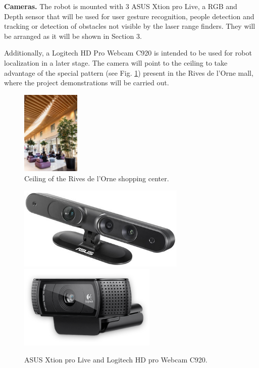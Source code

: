 {\bf Cameras.} The robot is mounted with 3 ASUS Xtion pro Live, a RGB
and Depth sensor that will be used for user gesture recognition,
people detection and tracking or detection of obstacles not visible by
the laser range finders. They will be arranged as it will be shown in
Section 3. 

Additionally, a Logitech HD Pro Webcam C920 is intended to be used for
robot localization in a later stage.  The camera will point to the ceiling
to take advantage of the special pattern (see Fig. \ref{fig:ceiling}) present in
the Rives de l'Orne mall, where the project demonstrations will be
carried out.

\begin{figure}[h!]
\begin{center}
\includegraphics[height=4cm]{fig/ceiling.jpg}
\end{center}
\caption{Ceiling of the Rives de l'Orne shopping center.}
\label{fig:ceiling}
\end{figure}

\begin{figure}[h!]
\begin{center}
\includegraphics[height=4cm]{fig/asusxtionprolive.jpg}
\includegraphics[height=4cm]{fig/logitech-hd-pro-webcam-c920.png}
\end{center}
\caption{ASUS Xtion pro Live and Logitech HD pro Webcam C920.}
\label{fig:cameras}
\end{figure}

